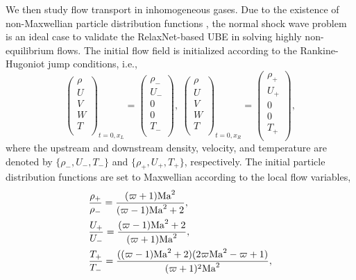 \documentclass[preprint,3p,12pt,sort&compress]{elsarticle}
\begin{document}
We then study flow transport in inhomogeneous gases.
Due to the existence of non-Maxwellian particle distribution functions \cite{mott1951solution}, the normal shock wave problem is an ideal case to validate the RelaxNet-based UBE in solving highly non-equilibrium flows.
The initial flow field is initialized according to the Rankine-Hugoniot jump conditions, i.e.,
\begin{equation*}
    \left(\begin{array}{c}
    \rho \\
    U \\
    V \\
    W \\
    T \\
    \end{array}\right)_{{t=0,x_L}}=\left(\begin{array}{c}
    \rho_- \\
    U_- \\
    0 \\
    0 \\
    T_- \\
    \end{array}\right),\ 
    \left(\begin{array}{c}
    \rho \\
    U \\
    V \\
    W \\
    T \\
    \end{array}\right)_{{t=0,x_R}}=\left(\begin{array}{c}
    \rho_+ \\
    U_+ \\
    0 \\
    0 \\
    T_+ \\
    \end{array}\right),
\end{equation*}
where the upstream and downstream density, velocity, and temperature are denoted by $\{\rho_-, U_-, T_-\}$ and $\{\rho_+, U_+, T_+\}$, respectively. 
The initial particle distribution functions are set to Maxwellian according to the local flow variables,
\begin{equation*}
\begin{aligned}
    &\frac{\rho_+}{\rho_-}=\frac{(\varpi+1)\rm{Ma}^2}{(\varpi-1)\rm{Ma}^2+2},\\
    &\frac{U_+}{U_-}=\frac{(\varpi-1)\rm{Ma}^2+2}{(\varpi+1)\rm{Ma}^2},\\
    &\frac{T_+}{T_-}=\frac{ ((\varpi-1)\rm{Ma}^2+2) (2\varpi\rm{Ma}^2-\varpi+1) }{(\varpi+1)^2 \rm{Ma}^2},
\end{aligned}
\end{equation*}
\end{document}
